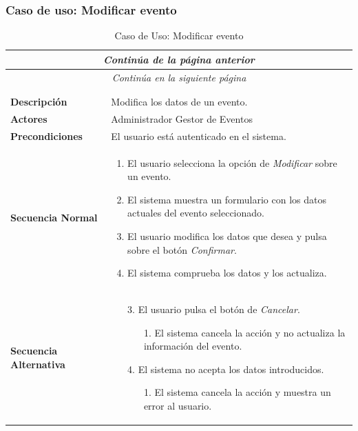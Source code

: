 


\newpage
\subsubsection*{Caso de uso: Modificar evento }
\begin{longtable}{| p{4cm} | p{10cm} |}
\endfirsthead
\multicolumn{2}{c}{\textit{Continúa de la página anterior}}\\[12pt]
\hline
\endhead
\hline
\multicolumn{2}{c}{\textit{Continúa en la siguiente página}} \\
\endfoot
\hline
\caption{Caso de Uso: Modificar evento}\label{fig:1}\\
\endlastfoot


\hline
\multicolumn{2}{|c|}{\textbf{CU$<$39$>$ - Modificar Evento}} \\

\hline
\textbf{Descripción} &
Modifica los datos de un evento.\\

\hline
\textbf{Actores} &
Administrador\newline
Gestor de Eventos\\

\hline
\textbf{Precondiciones} &
El usuario está autenticado en el sistema.\\

\hline
\textbf{Secuencia Normal} &\mbox{}\par\vspace{-\baselineskip}
\begin{enumerate}[leftmargin=0.7cm, topsep=0.1cm]
\item El usuario selecciona la opción de \textit{Modificar} sobre un evento.
\item El sistema muestra un formulario con los datos actuales del evento seleccionado.
\item El usuario modifica los datos que desea y pulsa sobre el botón \textit{Confirmar}.
\item El sistema comprueba los datos y los actualiza.
\end{enumerate}


\\
\hline
\textbf{Secuencia Alternativa} &\mbox{}\par\vspace{-\baselineskip}
\begin{enumerate}[leftmargin=0.9cm, topsep=0.1cm]
\item[3.] El usuario pulsa el botón de \textit{Cancelar}.
	\begin{itemize}
	\item[1.] El sistema cancela la acción y no actualiza la información del evento.
	\end{itemize}
\item[4.] El sistema no acepta los datos introducidos.
	\begin{itemize}
	\item[1.] El sistema cancela la acción y muestra un error al usuario.
	\end{itemize}
\end{enumerate}
\\


\end{longtable}
